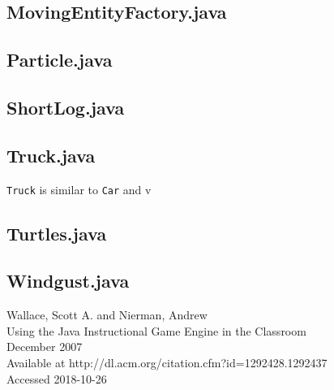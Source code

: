 \documentclass[12pt]{article}
\begin{document}
\subsection{MovingEntityFactory.java}

\subsection{Particle.java}

\subsection{ShortLog.java}

\subsection{Truck.java}
\verb|Truck| is similar to \verb|Car| and v

\subsection{Turtles.java}

\subsection{Windgust.java}

\begin{thebibliography}{0}
    Wallace, Scott A. and Nierman, Andrew\\
    Using the Java Instructional Game Engine in the Classroom\\
    December 2007\\
    Available at http://dl.acm.org/citation.cfm?id=1292428.1292437\\
    Accessed 2018-10-26
\end{thebibliography}
\end{document}
